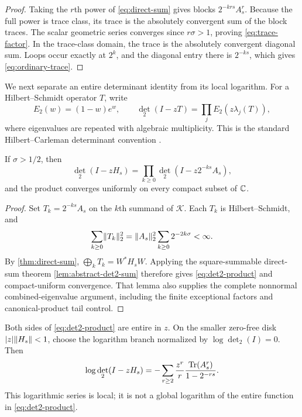\begin{proof}
Taking the $r$th power of \cref{eq:direct-sum} gives blocks
$2^{-krs}A_s^r$.  Because the full power is trace class, its trace is the
absolutely convergent sum of the block traces.  The scalar geometric series
converges since $r\sigma>1$, proving \cref{eq:trace-factor}.  In the
trace-class domain, the trace is the absolutely convergent diagonal sum.
Loops occur exactly at $2^k$, and the diagonal entry there is $2^{-ks}$,
which gives \cref{eq:ordinary-trace}.
\end{proof}

We next separate an entire determinant identity from its local logarithm.
For a Hilbert--Schmidt operator $T$, write
\[
  E_2(w)=(1-w)e^w,\qquad
  \det_2(I-zT)=\prod_j E_2(z\lambda_j(T)),
\]
where eigenvalues are repeated with algebraic multiplicity.  This is the
standard Hilbert--Carleman determinant convention
\citep{simon2005trace}.

\begin{proposition}
\label{prop:det2-product}
If $\sigma>1/2$, then
\begin{equation}
  \det_2(I-zH_s)
  =\prod_{k\ge0}\det_2(I-z2^{-ks}A_s),
  \label{eq:det2-product}
\end{equation}
and the product converges uniformly on every compact subset of $\mathbb C$.
\end{proposition}

\begin{proof}
Set $T_k=2^{-ks}A_s$ on the $k$th summand of $\mathcal K$.  Each $T_k$ is
Hilbert--Schmidt, and
\[
  \sum_{k\ge0}\lVert T_k\rVert_2^2
  =\lVert A_s\rVert_2^2\sum_{k\ge0}2^{-2k\sigma}<\infty.
\]
By \cref{thm:direct-sum}, $\bigoplus_kT_k=W^*H_sW$.  Applying the
square-summable direct-sum theorem \cref{lem:abstract-det2-sum} therefore
gives \cref{eq:det2-product} and compact-uniform convergence.  That lemma
also supplies the complete nonnormal combined-eigenvalue argument, including
the finite exceptional factors and canonical-product tail control.
\end{proof}

Both sides of \cref{eq:det2-product} are entire in $z$.  On the smaller
zero-free disk $\lvert z\rvert\lVert H_s\rVert<1$, choose the logarithm branch normalized
by $\log\det_2(I)=0$.  Then
\begin{equation}
  \log\det_2(I-zH_s)
  =-\sum_{r\ge2}\frac{z^r}{r}
      \frac{\operatorname{Tr}(A_s^r)}{1-2^{-rs}}.
  \label{eq:local-log-det2}
\end{equation}
This logarithmic series is local; it is not a global logarithm of the entire
function in \cref{eq:det2-product}.

